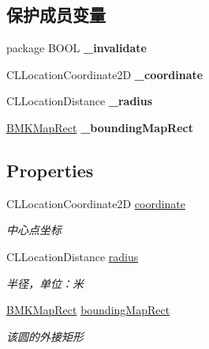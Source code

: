 \subsection*{保护成员变量}
\begin{DoxyCompactItemize}
\item 
\hypertarget{interface_b_m_k_circle_a2dffabfbaa1ac6642adc5a475d6ee453}{package B\-O\-O\-L {\bfseries \-\_\-invalidate}}\label{interface_b_m_k_circle_a2dffabfbaa1ac6642adc5a475d6ee453}

\item 
\hypertarget{interface_b_m_k_circle_abdd404f22d461b81d8d4d203778cee58}{C\-L\-Location\-Coordinate2\-D {\bfseries \-\_\-coordinate}}\label{interface_b_m_k_circle_abdd404f22d461b81d8d4d203778cee58}

\item 
\hypertarget{interface_b_m_k_circle_a84860dbbaa96509cfa4c7590908aabe8}{C\-L\-Location\-Distance {\bfseries \-\_\-radius}}\label{interface_b_m_k_circle_a84860dbbaa96509cfa4c7590908aabe8}

\item 
\hypertarget{interface_b_m_k_circle_abfa42e25c856dd426fb74b9531e1061b}{\hyperlink{struct_b_m_k_map_rect}{B\-M\-K\-Map\-Rect} {\bfseries \-\_\-bounding\-Map\-Rect}}\label{interface_b_m_k_circle_abfa42e25c856dd426fb74b9531e1061b}

\end{DoxyCompactItemize}
\subsection*{Properties}
\begin{DoxyCompactItemize}
\item 
\hypertarget{interface_b_m_k_circle_a1c516c10dec1971c686e07f814f333f9}{C\-L\-Location\-Coordinate2\-D \hyperlink{interface_b_m_k_circle_a1c516c10dec1971c686e07f814f333f9}{coordinate}}\label{interface_b_m_k_circle_a1c516c10dec1971c686e07f814f333f9}

\begin{DoxyCompactList}\small\item\em 中心点坐标 \end{DoxyCompactList}\item 
\hypertarget{interface_b_m_k_circle_a42507e4c17b4a1c1309fcbe06e370bf5}{C\-L\-Location\-Distance \hyperlink{interface_b_m_k_circle_a42507e4c17b4a1c1309fcbe06e370bf5}{radius}}\label{interface_b_m_k_circle_a42507e4c17b4a1c1309fcbe06e370bf5}

\begin{DoxyCompactList}\small\item\em 半径，单位：米 \end{DoxyCompactList}\item 
\hypertarget{interface_b_m_k_circle_a462a1696e47b1523dd481b22d43bcf46}{\hyperlink{struct_b_m_k_map_rect}{B\-M\-K\-Map\-Rect} \hyperlink{interface_b_m_k_circle_a462a1696e47b1523dd481b22d43bcf46}{bounding\-Map\-Rect}}\label{interface_b_m_k_circle_a462a1696e47b1523dd481b22d43bcf46}

\begin{DoxyCompactList}\small\item\em 该圆的外接矩形 \end{DoxyCompactList}\end{DoxyCompactItemize}
